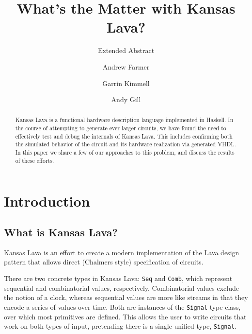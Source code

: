 \documentclass{llncs}
\begin{document}
\title{What's the Matter with Kansas Lava?}
\subtitle{Extended Abstract}

\author{Andrew Farmer \and Garrin Kimmell \and Andy Gill}


\maketitle

\begin{abstract}
Kansas Lava is a functional hardware description language implemented
in Haskell. In the course of attempting to generate ever larger circuits,
we have found the need to effectively test and debug the internals of
Kansas Lava. This includes confirming both the simulated behavior of the
circuit and its hardware realization via generated VHDL. In
this paper we share a few of our approaches to this problem, and discuss
the results of these efforts.
\end{abstract}

\section{Introduction}

\subsection{What is Kansas Lava?}

Kansas Lava is an effort to create a modern implementation of the Lava
design pattern that allows direct (Chalmers style) specification of circuits.

There are two concrete types in Kansas Lava: \verb!Seq! and \verb!Comb!, which represent
sequential and combinatorial values, respectively. Combinatorial values exclude the
notion of a clock, whereas sequential values are more like streams in that they
encode a series of values over time. Both are instances of the \verb!Signal! type class,
over which most primitives are defined.
This allows the user to write circuits that work on both types of input, pretending
there is a single unified type, \verb!Signal!.
\end{document}
